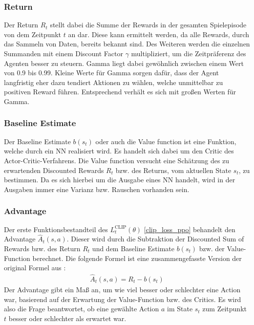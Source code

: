 \subsubsection{Return} \label{sec:Return}
Der Return $R_{t}$ stellt dabei die Summe der Rewards in der gesamten Spielepisode von dem Zeitpunkt $t$ an dar. Diese kann ermittelt werden, da alle Rewards, durch das Sammeln von Daten, bereits bekannt sind. Des Weiteren werden die einzelnen Summanden mit einem Discount Factor $\gamma$ multipliziert, um die Zeitpräferenz des Agenten besser zu steuern. Gamma liegt dabei gewöhnlich zwischen einem Wert von 0.9 bis 0.99. Kleine Werte für Gamma sorgen dafür, dass der Agent langfristig eher dazu tendiert Aktionen zu wählen, welche unmittelbar zu positiven Reward führen. Entsprechend verhält es sich mit großen Werten für Gamma. \cite[S. 42 ff.]{Sutton1998}

\subsubsection{Baseline Estimate} \label{sec:Baseline_Estimate}
Der Baseline Estimate $b(s_{t})$ oder auch die Value function ist eine Funktion, welche durch ein NN realisiert wird. Es handelt sich dabei um den Critic des Actor-Critic-Verfahrens. Die Value function versucht eine Schätzung des zu erwartenden Discounted Rewards $R_{t}$ bzw. des Returns, vom aktuellen State $s_{t}$, zu bestimmen. Da es sich hierbei um die Ausgabe eines NN handelt, wird in der Ausgaben immer eine Varianz bzw. Rauschen vorhanden sein. \cite[Kapitel 3]{asynchronous_methods_for_deep_rl}

\subsubsection{Advantage} \label{sec:Advantages}
Der erste Funktionsbestandteil des $L^\text{CLIP}_{t} (\theta)$ \ref{clip_loss_ppo} behandelt den Advantage $\hat{A}_{t}(s, a)$. Dieser wird durch die Subtraktion der Discounted Sum of Rewards bzw. des Return $R_{t}$ und dem Baseline Estimate $b(s_{t})$ bzw. der Value-Function berechnet. Die folgende Formel ist eine zusammengefasste Version der original Formel aus \cite{PPO}:
\begin{align}
	\hat{A}_{t}(s, a) = R_{t} - b(s_{t})
\end{align}
Der Advantage gibt ein Maß an, um wie viel besser oder schlechter eine Action war, basierend auf der Erwartung der Value-Function bzw. des Critics. Es wird also die Frage beantwortet, ob eine gewählte Action $a$ im State $s_{t}$ zum Zeitpunkt $t$ besser oder schlechter als erwartet war. \cite[Kapitel 3]{asynchronous_methods_for_deep_rl}


